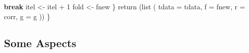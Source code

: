 \documentclass[
  12pt,
]{book}
\newenvironment{Shaded}{\begin{snugshade}}{\end{snugshade}}
\newcommand{\AttributeTok}[1]{\textcolor[rgb]{0.77,0.63,0.00}{#1}}
\newcommand{\ControlFlowTok}[1]{\textcolor[rgb]{0.13,0.29,0.53}{\textbf{#1}}}
\newcommand{\DecValTok}[1]{\textcolor[rgb]{0.00,0.00,0.81}{#1}}
\newcommand{\FunctionTok}[1]{\textcolor[rgb]{0.00,0.00,0.00}{#1}}
\newcommand{\NormalTok}[1]{#1}
\newcommand{\OtherTok}[1]{\textcolor[rgb]{0.56,0.35,0.01}{#1}}
\newcommand{\SpecialCharTok}[1]{\textcolor[rgb]{0.00,0.00,0.00}{#1}}
\begin{document}
\begin{Shaded}
\begin{Highlighting}[]
        \ControlFlowTok{break}
\NormalTok{      itel }\OtherTok{\textless{}{-}}\NormalTok{ itel }\SpecialCharTok{+} \DecValTok{1}
\NormalTok{      fold }\OtherTok{\textless{}{-}}\NormalTok{ fnew}
\NormalTok{    \}}
    \FunctionTok{return}\NormalTok{ (}\FunctionTok{list}\NormalTok{ (}
      \AttributeTok{tdata =}\NormalTok{ tdata,}
      \AttributeTok{f =}\NormalTok{ fnew,}
      \AttributeTok{r =}\NormalTok{ corr,}
      \AttributeTok{g =}\NormalTok{ g}
\NormalTok{    ))}
\NormalTok{  \}}
\end{Highlighting}
\end{Shaded}

\hypertarget{some-aspects}{%
\subsection{Some Aspects}\label{some-aspects}}
\end{document}
